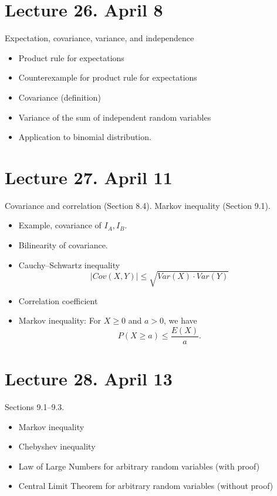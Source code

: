 \documentclass[letterpaper,11pt,oneside,reqno]{amsart}
\numberwithin{equation}{section}
\theoremstyle{definition}
\begin{document}
\section*{Lecture 26. April 8}

Expectation, covariance, variance, and independence
\begin{itemize}
	\item Product rule for expectations
	\item Counterexample for product rule for expectations
	\item Covariance (definition)
	\item Variance of the sum of independent random variables
	\item Application to binomial distribution.
\end{itemize}

\section*{Lecture 27. April 11}

Covariance and correlation (Section 8.4). Markov inequality (Section 9.1).
\begin{itemize}
	\item Example, covariance of $I_A,I_B$.
	\item Bilinearity of covariance.
	\item Cauchy--Schwartz inequality
		\begin{equation*}
			|Cov(X,Y)|\le\sqrt{Var(X)\cdot Var(Y)}
		\end{equation*}
	\item Correlation coefficient
	\item Markov inequality: For $X\ge0$ and $a>0$, we have
		\begin{equation*}
			P(X\ge a)\le \frac{E(X)}{a}.
		\end{equation*}
\end{itemize}

\section*{Lecture 28. April 13}

Sections 9.1--9.3.
\begin{itemize}
	\item Markov inequality
	\item Chebyshev inequality
	\item Law of Large Numbers for arbitrary random variables (with proof)
	\item Central Limit Theorem for arbitrary random variables (without proof)
\end{itemize}
\end{document}
